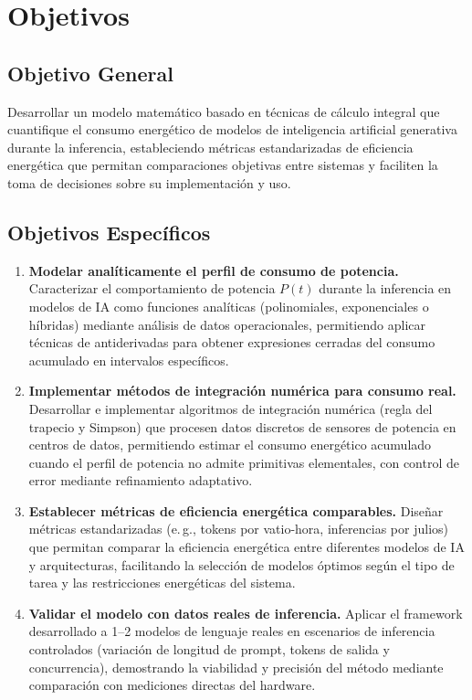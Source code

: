 \section{Objetivos}

\subsection{Objetivo General}

Desarrollar un modelo matemático basado en técnicas de cálculo integral que cuantifique el consumo energético de modelos de inteligencia artificial generativa durante la inferencia, estableciendo métricas estandarizadas de eficiencia energética que permitan comparaciones objetivas entre sistemas y faciliten la toma de decisiones sobre su implementación y uso.

\subsection{Objetivos Específicos}

\begin{enumerate}
    \item \textbf{Modelar analíticamente el perfil de consumo de potencia.} Caracterizar el comportamiento de potencia $P(t)$ durante la inferencia en modelos de IA como funciones analíticas (polinomiales, exponenciales o híbridas) mediante análisis de datos operacionales, permitiendo aplicar técnicas de antiderivadas para obtener expresiones cerradas del consumo acumulado en intervalos específicos.

    \item \textbf{Implementar métodos de integración numérica para consumo real.} Desarrollar e implementar algoritmos de integración numérica (regla del trapecio y Simpson) que procesen datos discretos de sensores de potencia en centros de datos, permitiendo estimar el consumo energético acumulado cuando el perfil de potencia no admite primitivas elementales, con control de error mediante refinamiento adaptativo.

    \item \textbf{Establecer métricas de eficiencia energética comparables.} Diseñar métricas estandarizadas (e.\,g., tokens por vatio-hora, inferencias por julios) que permitan comparar la eficiencia energética entre diferentes modelos de IA y arquitecturas, facilitando la selección de modelos óptimos según el tipo de tarea y las restricciones energéticas del sistema.
    
    \item \textbf{Validar el modelo con datos reales de inferencia.} Aplicar el framework desarrollado a 1--2 modelos de lenguaje reales en escenarios de inferencia controlados (variación de longitud de prompt, tokens de salida y concurrencia), demostrando la viabilidad y precisión del método mediante comparación con mediciones directas del hardware.
\end{enumerate}